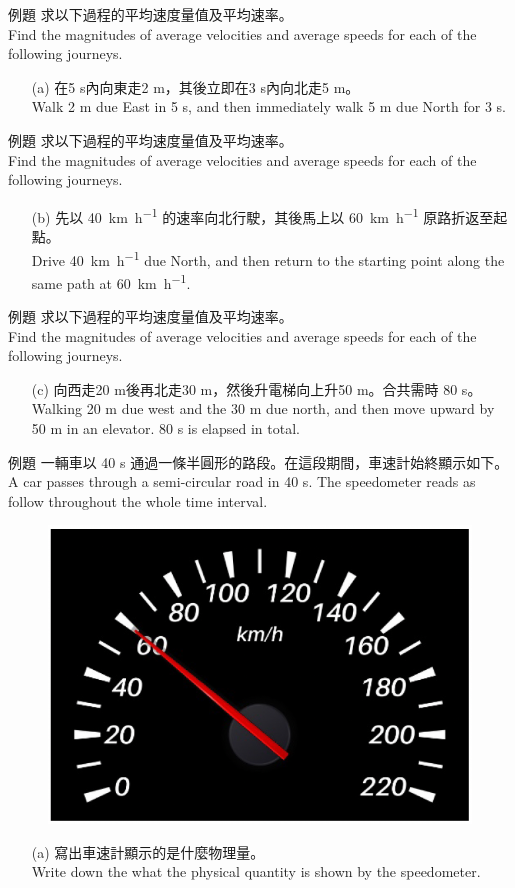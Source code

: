 \documentclass[beamer=true]{standalone}
\begin{document}
\begin{frame}[t]{例題}
    求以下過程的平均速度量值及平均速率。 \\Find the magnitudes of average velocities and average speeds for each of the following journeys.
    \begin{itemize}
        \item [(a)]在5 s內向東走2 m，其後立即在3 s內向北走5 m。 \\Walk 2 m due East in 5 s, and then immediately walk 5 m due North for 3 s.
    \end{itemize}
\end{frame}
\begin{frame}[t]{例題}
    求以下過程的平均速度量值及平均速率。 \\Find the magnitudes of average velocities and average speeds for each of the following journeys.
    \begin{itemize}
        \item [(b)]先以 \qty{40}{km.h^{-1}} 的速率向北行駛，其後馬上以 \qty{60}{km.h^{-1}} 原路折返至起點。 \\Drive \qty{40}{km.h^{-1}} due North, and then return to the starting point along the same path at \qty{60}{km.h^{-1}}.
    \end{itemize}
\end{frame}
\begin{frame}[t]{例題}
    求以下過程的平均速度量值及平均速率。 \\Find the magnitudes of average velocities and average speeds for each of the following journeys.
    \begin{itemize}
        \item [(c)]向西走20 m後再北走30 m，然後升電梯向上升50 m。合共需時 80 s。 \\Walking 20 m due west and the 30 m due north, and then move upward by 50 m in an elevator. 80 s is elapsed in total.
    \end{itemize}
\end{frame}
\begin{frame}[t]{例題}
    一輛車以 40 s 通過一條半圓形的路段。在這段期間，車速計始終顯示如下。\\ A car passes through a semi-circular road in 40 s. The speedometer reads as follow throughout the whole time interval.
    \begin{figure}[h!]
        \centering
        \includegraphics[width=.35\textwidth]{../../assets/fca35903.png}
    \end{figure}
    \begin{itemize}
        \item [(a)]寫出車速計顯示的是什麼物理量。 \\Write down the what the physical quantity is shown by the speedometer.
    \end{itemize}
\end{frame}
\end{document}
